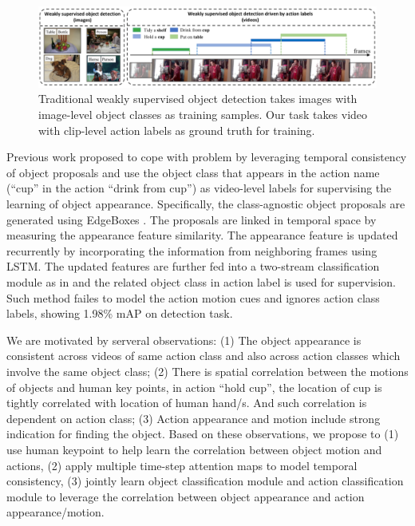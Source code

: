 \begin{figure}
\includegraphics[width=1.0\textwidth]{figures/task_definition.pdf}
\caption{Traditional weakly supervised object detection takes images with image-level object classes as training samples. Our task takes video with clip-level action labels as ground truth for training.}
\label{fig:task_definition}
\end{figure}

Previous work \cite{yuan2017temporal} proposed to cope with problem by leveraging temporal consistency of object proposals and use the object class that appears in the action name (\eg ``cup'' in the action ``drink from cup'') as video-level labels for supervising the learning of object appearance. Specifically, the class-agnostic object proposals are generated using EdgeBoxes \cite{zitnick2014edge}. The proposals are linked in temporal space by measuring the appearance feature similarity. The appearance feature is updated recurrently by incorporating the information from neighboring frames using LSTM. The updated features are further fed into a two-stream classification module as in \cite{bilen2016weakly} and the related object class in action label is used for supervision. Such method failes to model the action motion cues and ignores action class labels, showing 1.98\% mAP on detection task.  

We are motivated by serveral observations: (1) The object appearance is consistent across videos of same action class and also across action classes which involve the same object class; (2) There is spatial correlation between the motions of objects and human key points, \eg in action ``hold cup'', the location of cup is tightly correlated with location of human hand/s. And such correlation is dependent on action class; (3) Action appearance and motion include strong indication for finding the object. Based on these observations, we propose to (1) use human keypoint to help learn the correlation between object motion and actions, (2) apply multiple time-step attention maps to model temporal consistency, (3) jointly learn object classification module and action classification module to leverage the correlation between object appearance and action appearance/motion.

